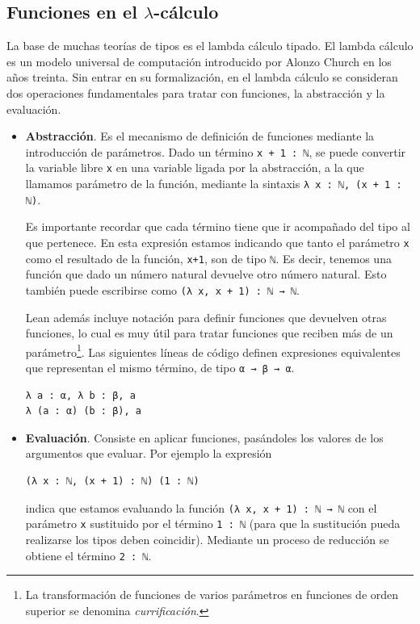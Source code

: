 \subsection{Funciones en el $\lambda$-c\'{a}lculo}

La base de muchas teorías de tipos es el lambda cálculo tipado. El lambda
cálculo es un modelo universal de computación introducido por Alonzo Church en
los años treinta. Sin entrar en su formalización, en el lambda cálculo se
consideran dos operaciones fundamentales para tratar con funciones, la
abstracción y la evaluación.

\begin{itemize}[topsep=0pt]
	\item \textbf{Abstracción}. Es el mecanismo de definición de funciones mediante
	      la introducción de parámetros. Dado un término \lstinline{x + 1 : ℕ},
	      se puede convertir la variable libre \lstinline{x} en una variable
	      ligada por la abstracción, a la que llamamos parámetro de la función,
	      mediante la sintaxis \lstinline{λ x : ℕ, (x + 1 : ℕ)}.

	      Es importante recordar que cada término tiene que ir acompañado del tipo al
	      que pertenece. En esta expresión estamos indicando que tanto el parámetro
	      \lstinline{x} como el resultado de la función, \lstinline{x+1}, son de tipo
	      \lstinline{ℕ}. Es decir, tenemos una función que dado un número natural
	      devuelve otro número natural. Esto también puede escribirse como
	      \lstinline{(λ x, x + 1) : ℕ → ℕ}.

	      Lean además incluye notación para definir funciones que devuelven
	      otras funciones, lo cual es muy útil para tratar funciones que reciben
	      más de un parámetro\footnote{La transformación de funciones de varios
		      parámetros en funciones de orden superior se denomina
		      \textit{currificación}.}. Las siguientes líneas de código definen
	      expresiones equivalentes que representan el mismo término, de tipo
	      \lstinline{α → β → α}.

	      \begin{lstlisting}
λ a : α, λ b : β, a
λ (a : α) (b : β), a
\end{lstlisting}

	\item \textbf{Evaluación}. Consiste en aplicar funciones, pasándoles los
	      valores de los argumentos que evaluar. Por ejemplo la expresión

	      \begin{lstlisting}
(λ x : ℕ, (x + 1) : ℕ) (1 : ℕ)              
\end{lstlisting}

	      indica que estamos evaluando la función \lstinline{(λ x, x + 1) : ℕ → ℕ} con el parámetro \lstinline{x} sustituido por el término
	      \lstinline{1 : ℕ} (para que la sustitución pueda realizarse los tipos
	      deben coincidir). Mediante un proceso de reducción se obtiene el
	      término \lstinline{2 : ℕ}.

\end{itemize}

